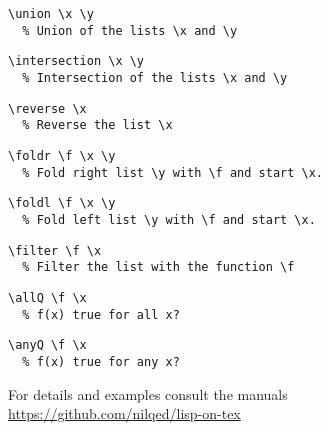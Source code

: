 \documentclass[a4paper,landscape,columns=3]{cheatsheet}
\begin{document}
%
\begin{lstlisting}
\union \x \y 
  % Union of the lists \x and \y
\end{lstlisting}
%
\begin{lstlisting}
\intersection \x \y 
  % Intersection of the lists \x and \y
\end{lstlisting}
%
\begin{lstlisting}
\reverse \x 
  % Reverse the list \x
\end{lstlisting}
%
\begin{lstlisting}
\foldr \f \x \y 
  % Fold right list \y with \f and start \x.  
\end{lstlisting}
%
\begin{lstlisting}
\foldl \f \x \y 
  % Fold left list \y with \f and start \x.  
\end{lstlisting}
%
\begin{lstlisting}
\filter \f \x 
  % Filter the list with the function \f
\end{lstlisting}
%
\begin{lstlisting}
\allQ \f \x 
  % f(x) true for all x?
\end{lstlisting}
%
\begin{lstlisting}
\anyQ \f \x 
  % f(x) true for any x?
\end{lstlisting}
%


\scriptsize{For details and examples consult the manuals} \\
\scriptsize{\url{https://github.com/nilqed/lisp-on-tex}}
\end{document}
